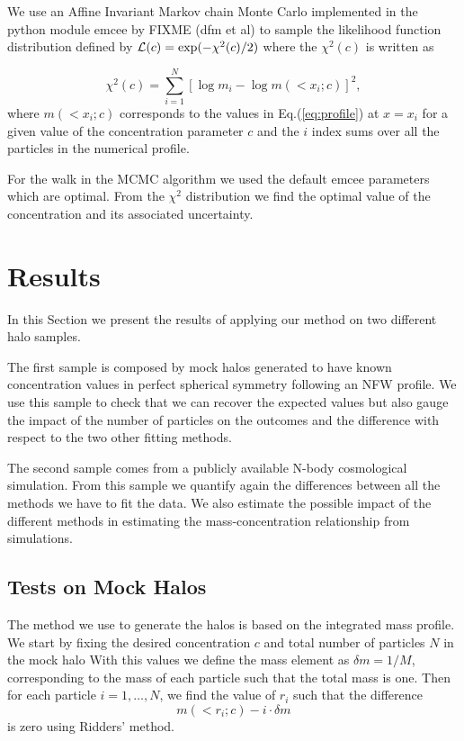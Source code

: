 \documentclass{emulateapj}
\begin{document}
We use an Affine Invariant Markov chain Monte Carlo implemented in the python
module emcee by FIXME (dfm et al) to sample the likelihood
function distribution defined by ${\cal L}(c)=\exp(-\chi^2(c)/2)$
where the $\chi^2(c)$ is written as

\begin{equation}
\chi^2(c)= \sum_{i=1}^{N}[\log m_i - \log m(< x_i;c)]^2,
\end{equation}
%
where $m(<x_i;c)$ corresponds to the values in Eq.(\ref{eq:profile}) at
$x=x_i$ for a given value of the concentration parameter $c$ and the
$i$ index sums over all the particles in the numerical profile.

For the walk in the MCMC algorithm we used the default emcee parameters which
are optimal. From the $\chi^2$ distribution we find the optimal value of the
concentration and  its associated uncertainty.

\section{Results}
\label{sec:results}

In this Section we present the results of applying our method on two
different halo samples.

The first sample is composed by mock halos generated to have known
concentration values in perfect spherical symmetry following an NFW
profile.
We use this sample to check that we can recover the expected values
but also gauge the impact of the number of particles on the outcomes
and the difference with respect to the two other fitting methods.

The second sample comes from a publicly available N-body cosmological
simulation.
From this sample we quantify again the differences between all the
methods we have to fit the data.
We also estimate the possible impact of the different methods in
estimating the mass-concentration relationship from simulations.

\subsection{Tests on Mock Halos}

The method we use to generate the halos is based on the integrated
mass profile.
We start by fixing the desired concentration $c$ and total number of
particles $N$ in the mock halo
With this values we define the mass element as $\delta m = 1/M$, corresponding
to the mass of each particle such that the total mass is one.
Then for each particle $i=1,\ldots,N$, we find the value of $r_i$ such that
the difference
%
\begin{equation}
m(<r_i;c) - i \cdot \delta m
\end{equation}
%
is zero using Ridders' method.
\end{document}
